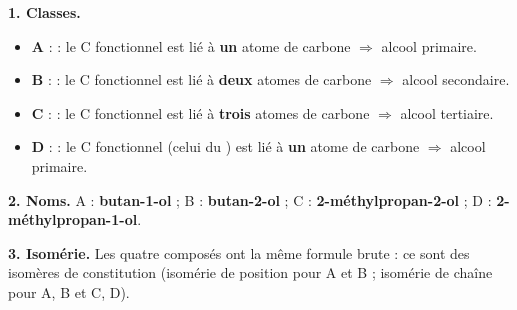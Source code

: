 \documentclass[11pt]{article}
\newcommand{\cle}[1]{{\popxbold\color{popdark}#1}}
\begin{document}
\begin{corrige}
\textbf{1. Classes.}
\begin{itemize}
\item \textbf{A} :  : le C fonctionnel est lié à \textbf{un} atome de carbone $\Rightarrow$ alcool \cle{primaire}.
\item \textbf{B} :  : le C fonctionnel est lié à \textbf{deux} atomes de carbone $\Rightarrow$ alcool \cle{secondaire}.
\item \textbf{C} :  : le C fonctionnel est lié à \textbf{trois} atomes de carbone $\Rightarrow$ alcool \cle{tertiaire}.
\item \textbf{D} :  : le C fonctionnel (celui du ) est lié à \textbf{un} atome de carbone $\Rightarrow$ alcool \cle{primaire}.
\end{itemize}
\textbf{2. Noms.} A : \textbf{butan-1-ol} ; B : \textbf{butan-2-ol} ; C : \textbf{2-méthylpropan-2-ol} ; D : \textbf{2-méthylpropan-1-ol}.

\textbf{3. Isomérie.} Les quatre composés ont la même formule brute  : ce sont des \cle{isomères de constitution} (isomérie de position pour A et B ; isomérie de chaîne pour A, B et C, D).
\end{corrige}
\end{document}
